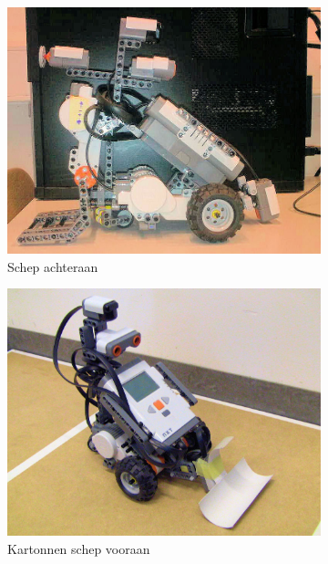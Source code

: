 \documentclass[eind]{penoverslag}
\begin{document}
\begin{figure}
\centering
	\begin{subfigure}[h]{0.325\textwidth}
	\centering
		\includegraphics[width=\textwidth]{robotOud1}
		\caption{Schep achteraan}
		\label{fig:robotOud1}
	\end{subfigure}
	\begin{subfigure}[h]{0.325\textwidth}
		\centering
		\includegraphics[width=\textwidth]{robotOud2}
		\caption{Kartonnen schep vooraan}
		\label{fig:robotOud2}
	\end{subfigure}
	\begin{subfigure}[h]{0.325\textwidth}

\end{subfigure}
\end{figure}
\end{document}
